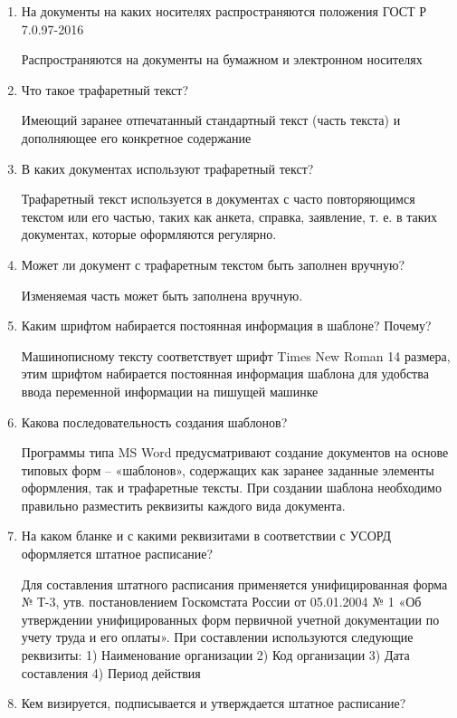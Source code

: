 \documentclass[a4paper,10pt]{article}
\theoremstyle{plain} %
\theoremstyle{definition} %
\theoremstyle{remark} %
\begin{document}
\begin{enumerate}
	\item На документы на каких носителях распространяются положения ГОСТ Р 7.0.97-2016
	
	Распространяются на документы на бумажном и электронном носителях

	\item Что такое трафаретный текст?
	
	Имеющий заранее отпечатанный стандартный текст (часть текста) и дополняющее его конкретное содержание

	\item В каких документах используют трафаретный текст?
	
	Трафаретный текст используется в документах с часто повторяющимся текстом или его частью, таких как анкета, справка, заявление, т. е. в таких документах, которые оформляются регулярно.

	\item Может ли документ с трафаретным текстом быть заполнен вручную?
	
	Изменяемая часть может быть заполнена вручную.

	\item Каким шрифтом набирается постоянная информация в шаблоне? Почему?
	
	Машинописному тексту соответствует шрифт Times New Roman 14 размера, этим шрифтом набирается постоянная информация шаблона для удобства ввода переменной информации на пишущей машинке

	\item Какова последовательность создания шаблонов?
	
	Программы типа MS Word предусматривают создание документов на основе типовых форм – «шаблонов», содержащих как заранее заданные элементы оформления, так и трафаретные тексты.
	При создании шаблона необходимо правильно разместить реквизиты каждого вида документа. 
	

	\item На каком бланке и с какими реквизитами в соответствии с УСОРД оформляется штатное расписание?
	
	Для составления штатного расписания применяется унифицированная форма № Т-3, утв. постановлением Госкомстата России от 05.01.2004 № 1 «Об утверждении унифицированных форм первичной учетной документации по учету труда и его оплаты».
	При составлении используются следующие реквизиты:
	1) Наименование организации
	2) Код организации
	3) Дата составления
	4) Период действия

	\item Кем визируется, подписывается и утверждается штатное расписание?
	

\end{enumerate}
\end{document}
